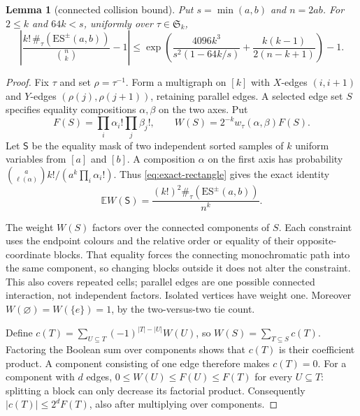 \documentclass[11pt,letterpaper]{article}
\newtheorem{lemma}[theorem]{Lemma}
\newcommand{\Ssym}{\mathfrak S}
\begin{document}
\begin{lemma}[connected collision bound]\label{lem:connected-collisions}
Put $s=\min(a,b)$ and $n=2ab$. For $2\le k$ and $64k<s$, uniformly over
$\tau\in\Ssym_k$,
\begin{equation}\label{eq:connected-bound}
 \left|\frac{k!\,\#_\tau(\mathrm{ES}^{\pm}(a,b))}{\binom nk}-1\right|
 \le\exp\left(\frac{4096k^3}{s^2(1-64k/s)}
              +\frac{k(k-1)}{2(n-k+1)}\right)-1.
\end{equation}
\end{lemma}
\begin{proof}
Fix $\tau$ and set $\rho=\tau^{-1}$. Form a multigraph on $[k]$ with
$X$-edges $(i,i+1)$ and $Y$-edges $(\rho(j),\rho(j+1))$, retaining
parallel edges. A selected edge set $S$ specifies equality compositions
$\alpha,\beta$ on the two axes. Put
\[
 F(S)=\prod_i\alpha_i!\prod_j\beta_j!,\qquad
 W(S)=2^{-k}w_\tau(\alpha,\beta)F(S).
\]
Let $\mathsf S$ be the equality mask of two independent sorted samples of
$k$ uniform variables from $[a]$ and $[b]$. A composition $\alpha$ on the
first axis has probability $\binom a{\ell(\alpha)}k!/(a^k\prod_i\alpha_i!)$.
Thus \eqref{eq:exact-rectangle} gives the exact identity
\begin{equation}\label{eq:collision-expectation}
 \mathbb EW(\mathsf S)=\frac{(k!)^2\#_\tau(\mathrm{ES}^{\pm}(a,b))}{n^k}.
\end{equation}

The weight $W(S)$ factors over the connected components of $S$. Each
constraint uses the endpoint colours and the relative order or equality
of their opposite-coordinate blocks. That equality forces the connecting
monochromatic path into the same component, so changing blocks outside it
does not alter the constraint. This also covers repeated cells; parallel
edges are one possible connected interaction, not independent factors.
Isolated vertices have weight one. Moreover $W(\varnothing)=W(\{e\})=1$,
by the two-versus-two tie count.

Define $c(T)=\sum_{U\subseteq T}(-1)^{|T|-|U|}W(U)$, so
$W(S)=\sum_{T\subseteq S}c(T)$. Factoring the Boolean sum over components
shows that $c(T)$ is their coefficient product. A component consisting of
one edge therefore makes $c(T)=0$. For a component with $d$ edges,
$0\le W(U)\le F(U)\le F(T)$ for every $U\subseteq T$: splitting a block
can only decrease its factorial product. Consequently
$|c(T)|\le2^dF(T)$, also after multiplying over components.


\end{proof}
\end{document}
